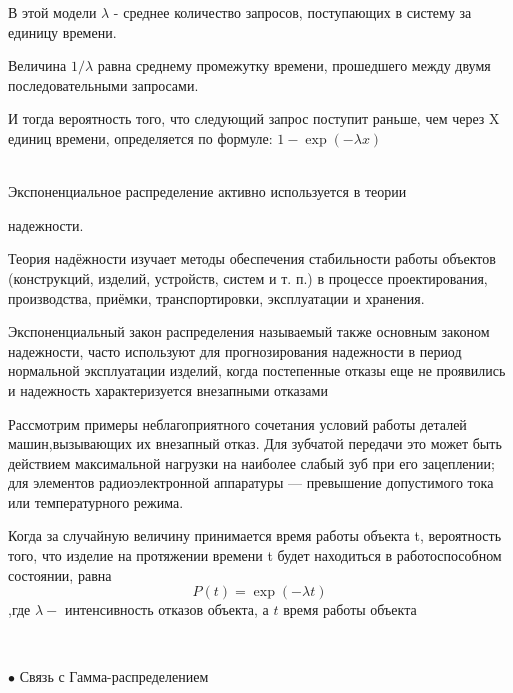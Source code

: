 \documentclass[a4paper,12pt, oneside]{book}
\begin{document}
{{В этой модели $\lambda $ - среднее количество запросов, поступающих в систему за единицу времени. 

Величина $1/\lambda $ равна среднему промежутку времени, прошедшего между двумя последовательными запросами.

И тогда  вероятность того, что следующий запрос поступит раньше, чем через X единиц времени, определяется по формуле:  $1- \exp(-\lambda x)$ 
\\


\vspace{5mm}
\\
\vspace{5mm}

Экспоненциальное распределение активно используется в теории 

надежности.\cite{rt5}


Теория надёжности изучает методы обеспечения стабильности работы объектов (конструкций, изделий, устройств, систем и т. п.) в процессе проектирования, производства, приёмки, транспортировки, эксплуатации и хранения.

Экспоненциальный закон распределения называемый также основным законом надежности, часто используют для прогнозирования надежности в период нормальной эксплуатации изделий, когда постепенные отказы еще не проявились и надежность характеризуется внезапными отказами

Рассмотрим примеры неблагоприятного сочетания условий работы деталей машин,вызывающих их внезапный отказ. Для зубчатой передачи это может быть действием максимальной нагрузки на наиболее слабый зуб при его зацеплении;
для элементов радиоэлектронной аппаратуры — превышение допустимого тока или температурного режима.

Когда за случайную величину принимается время работы объекта t, вероятность того, что изделие на протяжении времени t будет находиться в работоспособном состоянии, равна
$$
P(t) = \exp(-\lambda t)
$$
,где $\lambda-$ интенсивность отказов объекта, а $t$ время работы объекта

\vspace{5mm}
\\
\vspace{5mm}

{\sf$\bullet$ Связь с Гамма-распределением}
\vspace{5mm}

}}
\end{document}
